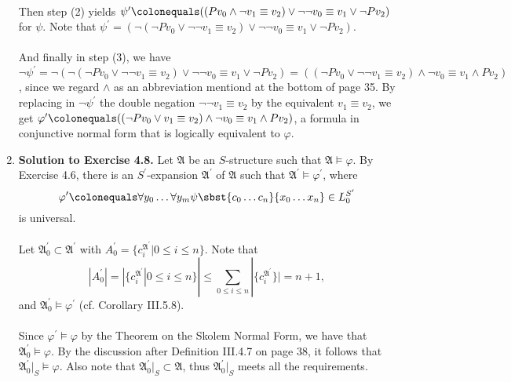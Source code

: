 \begin{enumerate}[1.]
\ \\
Then step (2) yields $\psi^\prime \colonequals ((Pv_0 \land \neg v_1 \equiv v_2) \lor \neg\neg v_0 \equiv v_1 \lor \neg Pv_2)$ for $\psi$. Note that $\psi^\prime = (\neg (\neg Pv_0 \lor \neg\neg v_1 \equiv v_2 ) \lor \neg\neg v_0 \equiv v_1 \lor \neg Pv_2)$.\\
\ \\
And finally in step (3), we have $\neg\psi^\prime = \neg (\neg (\neg Pv_0 \lor \neg\neg v_1 \equiv v_2 ) \lor \neg\neg v_0 \equiv v_1 \lor \neg Pv_2) = ((\neg Pv_0 \lor \neg\neg v_1 \equiv v_2) \land \neg v_0 \equiv v_1 \land Pv_2)$, since we regard $\land$ as an abbreviation mentiond  at the bottom of page 35. By replacing in $\neg\psi^\prime$ the double negation $\neg\neg v_1 \equiv v_2$ by the equivalent $v_1 \equiv v_2$, we get $\varphi^\prime \colonequals ((\neg Pv_0 \lor v_1 \equiv v_2) \land \neg v_0 \equiv v_1 \land Pv_2)$, a formula in conjunctive normal form that is logically equivalent to $\varphi$.
%
\item \textbf{Solution to Exercise 4.8.} Let $\mathfrak{A}$ be an $S$-structure such that $\mathfrak{A} \models \varphi$. By Exercise 4.6, there is an $S^\prime$-expansion $\mathfrak{A}^\prime$ of $\mathfrak{A}$ such that $\mathfrak{A}^\prime \models \varphi^\prime$, where
\[
\varphi^\prime \colonequals \forall y_0 \ldots \forall y_m \psi\sbst{c_0 \ldots c_n}{x_0 \ldots x_n} \in L_0^{S^\prime}
\]
is universal.\\
\\
Let $\mathfrak{A}_0^\prime \subset \mathfrak{A}^\prime$ with $A_0^\prime = \{ c_i^{\mathfrak{A}^\prime} | 0 \leq i \leq n \}$. Note that
\[
| A_0^\prime | = | \{ c_i^{\mathfrak{A}^\prime} | 0 \leq i \leq n \} | \leq \sum_{0 \leq i \leq n} | \{ c_i^{\mathfrak{A}^\prime} \} | = n + 1,
\]
and $\mathfrak{A}_0^\prime \models \varphi^\prime$ (cf. Corollary III.5.8).\\
\\
Since $\varphi^\prime \models \varphi$ by the Theorem on the Skolem Normal Form, we have that $\mathfrak{A}_0^\prime \models \varphi$. By the discussion after Definition III.4.7 on page 38, it follows that $\mathfrak{A}_0^\prime |_S \models \varphi$. Also note that $\mathfrak{A}_0^\prime |_S \subset \mathfrak{A}$, thus $\mathfrak{A}_0^\prime |_S$ meets all the requirements.\\

\end{enumerate}
